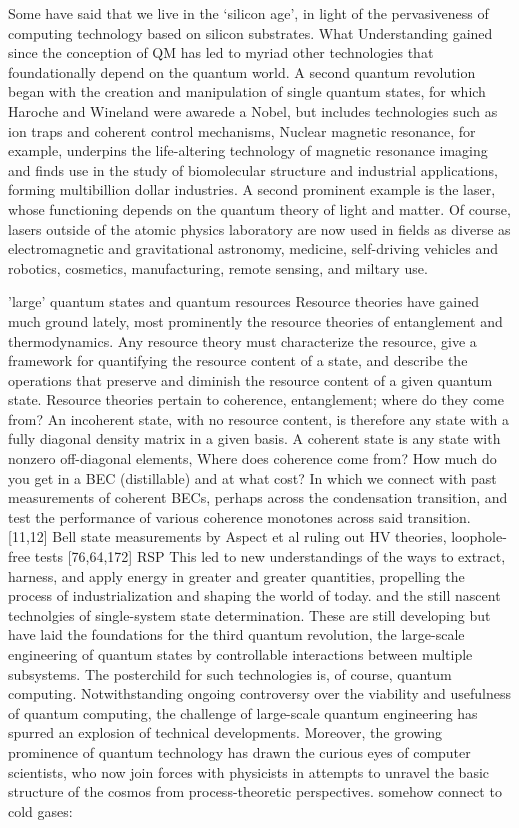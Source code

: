 Some have said that we live in the `silicon age', in light of the
	pervasiveness of computing technology based on silicon substrates.
	What	Understanding	gained since the conception of QM has led to myriad other technologies	that foundationally depend on the quantum world.
	A second quantum	revolution began with the creation and manipulation of single quantum	states, for which Haroche and Wineland were awarede a Nobel, but	includes technologies such as ion traps and coherent control mechanisms,
	Nuclear magnetic	resonance, for example, underpins the life-altering technology of	magnetic resonance imaging and finds use in the study of biomolecular	structure and industrial applications, forming multibillion dollar	industries.
	A second prominent example is the laser, whose functioning
	depends on the quantum theory of light and matter.
	Of course, lasers outside of	the atomic physics laboratory are now used in fields as diverse	as electromagnetic and gravitational astronomy, medicine, self-driving	vehicles and robotics, cosmetics, manufacturing, remote sensing, and	miltary use.


	
	'large' quantum states and quantum resources
	Resource theories have gained much ground lately, most prominently the resource theories of entanglement and thermodynamics.
	Any resource theory must characterize the resource, give a framework for quantifying the resource content of a state, and describe the operations that preserve and diminish the resource content of a given quantum state.
	Resource theories pertain to coherence, entanglement; where do they come from? An incoherent state, with no resource content, is therefore any state with a fully diagonal density matrix in a given basis.
	A coherent state is any state with  nonzero off-diagonal elements, Where does coherence come from? How much do you get in a BEC (distillable) and at what cost?	In which we connect with past measurements of coherent BECs, perhaps across the condensation transition, and test the performance of various coherence monotones across said transition.
	[11,12] Bell state measurements by Aspect et al ruling out HV theories, loophole-free tests [76,64,172] RSP
	This led to new understandings of the ways to extract, harness, and apply energy in greater and greater quantities, propelling the process of industrialization and shaping the world of today.
	and the still nascent technolgies of single-system state determination.
	These are still developing but have laid the foundations for the third
	quantum revolution, the large-scale engineering of quantum states by
	controllable interactions between multiple subsystems.
	The posterchild
	for such technologies is, of course, quantum computing.
	Notwithstanding
	ongoing controversy over the viability and usefulness of quantum
	computing, the challenge of large-scale quantum engineering has spurred
	an explosion of technical developments.
	Moreover, the growing prominence
	of quantum technology has drawn the curious eyes of computer scientists,
	who now join forces with physicists in attempts to unravel the basic
	structure of the cosmos from process-theoretic perspectives.
	somehow connect to cold gases: 

